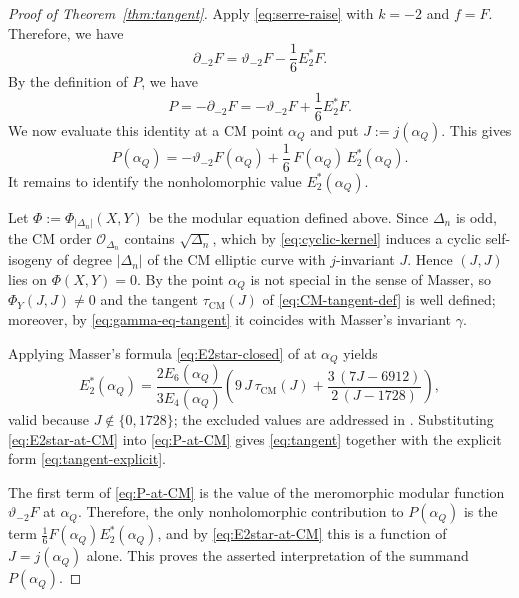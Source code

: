 \documentclass[12pt]{amsart}
\theoremstyle{definition}
\theoremstyle{remark}
\newcommand{\cO}{\mathcal{O}}
\begin{document}
\begin{proof}[Proof of Theorem~\ref{thm:tangent}]
Apply \eqref{eq:serre-raise} with $k=-2$ and $f=F$.  Therefore, we have
\[
        \partial_{-2}F
        =
        \vartheta_{-2}F-\frac{1}{6}E_2^*F.
\]
By the definition of $P$, we  have
\[
        P=-\partial_{-2}F
        =
        -\vartheta_{-2}F+\frac{1}{6}E_2^*F.
\]
We now evaluate this identity at a CM point $\alpha_Q$ and put $J:=j(\alpha_Q)$.
This gives
\begin{equation}\label{eq:P-at-CM}
        P(\alpha_Q)=-\vartheta_{-2}F(\alpha_Q)+\frac16\,F(\alpha_Q)\,E_2^*(\alpha_Q).
\end{equation}
It remains to identify the nonholomorphic value $E_2^*(\alpha_Q)$.

Let $\Phi:=\Phi_{|\Delta_n|}(X,Y)$ be the modular equation defined above.
Since $\Delta_n$ is odd, the CM order $\cO_{\Delta_n}$ contains $\sqrt{\Delta_n}$, which by
\eqref{eq:cyclic-kernel} induces a cyclic self-isogeny of degree $|\Delta_n|$ of the CM elliptic
curve with $j$-invariant $J$. Hence $(J,J)$ lies on $\Phi(X,Y)=0$. By  the
point $\alpha_Q$ is not special in the sense of Masser, so $\Phi_Y(J,J)\ne0$ and the tangent
$\tau_{\mathrm{CM}}(J)$ of \eqref{eq:CM-tangent-def} is well defined; moreover, by
\eqref{eq:gamma-eq-tangent} it coincides with Masser's invariant $\gamma$.

Applying Masser's formula \eqref{eq:E2star-closed} of  at $\alpha_Q$ yields
\begin{equation}\label{eq:E2star-at-CM}
        E_2^*(\alpha_Q)
        =\frac{2E_6(\alpha_Q)}{3E_4(\alpha_Q)}
        \left(9\,J\,\tau_{\mathrm{CM}}(J)+\frac{3\,(7J-6912)}{2\,(J-1728)}\right),
\end{equation}
valid because $J\notin\{0,1728\}$; the excluded values are addressed in .
Substituting \eqref{eq:E2star-at-CM} into \eqref{eq:P-at-CM} gives \eqref{eq:tangent} together
with the explicit form \eqref{eq:tangent-explicit}.

The first term of \eqref{eq:P-at-CM} is the value of the meromorphic modular function
$\vartheta_{-2}F$ at $\alpha_Q$. Therefore, the only nonholomorphic contribution to
$P(\alpha_Q)$ is the term $\tfrac16 F(\alpha_Q)E_2^*(\alpha_Q)$, and by
\eqref{eq:E2star-at-CM} this is a function of $J=j(\alpha_Q)$ alone. This proves the asserted
interpretation of the summand $P(\alpha_Q)$.
\end{proof}
\end{document}
